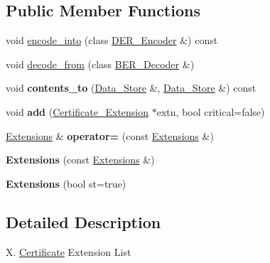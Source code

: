 \subsection*{Public Member Functions}
\begin{DoxyCompactItemize}
\item 
void \hyperlink{classBotan_1_1Extensions_a0481a2dbb859e6bceb2175a05ae1b677}{encode\-\_\-into} (class \hyperlink{classBotan_1_1DER__Encoder}{D\-E\-R\-\_\-\-Encoder} \&) const 
\item 
void \hyperlink{classBotan_1_1Extensions_adf10cf680ad029d66bec43437df44ab8}{decode\-\_\-from} (class \hyperlink{classBotan_1_1BER__Decoder}{B\-E\-R\-\_\-\-Decoder} \&)
\item 
\hypertarget{classBotan_1_1Extensions_a42724aad6ce755fe38a4aa60bc0d837a}{void {\bfseries contents\-\_\-to} (\hyperlink{classBotan_1_1Data__Store}{Data\-\_\-\-Store} \&, \hyperlink{classBotan_1_1Data__Store}{Data\-\_\-\-Store} \&) const }\label{classBotan_1_1Extensions_a42724aad6ce755fe38a4aa60bc0d837a}

\item 
\hypertarget{classBotan_1_1Extensions_aff13510727b5e8a77a2c375ee6551201}{void {\bfseries add} (\hyperlink{classBotan_1_1Certificate__Extension}{Certificate\-\_\-\-Extension} $\ast$extn, bool critical=false)}\label{classBotan_1_1Extensions_aff13510727b5e8a77a2c375ee6551201}

\item 
\hypertarget{classBotan_1_1Extensions_a16739cfe6fa191dad9acfe8c1e30ce5c}{\hyperlink{classBotan_1_1Extensions}{Extensions} \& {\bfseries operator=} (const \hyperlink{classBotan_1_1Extensions}{Extensions} \&)}\label{classBotan_1_1Extensions_a16739cfe6fa191dad9acfe8c1e30ce5c}

\item 
\hypertarget{classBotan_1_1Extensions_ae6e72ef343ba300763d2ff34807ae390}{{\bfseries Extensions} (const \hyperlink{classBotan_1_1Extensions}{Extensions} \&)}\label{classBotan_1_1Extensions_ae6e72ef343ba300763d2ff34807ae390}

\item 
\hypertarget{classBotan_1_1Extensions_a78b2df16b74373f1189eae9ed774bd80}{{\bfseries Extensions} (bool st=true)}\label{classBotan_1_1Extensions_a78b2df16b74373f1189eae9ed774bd80}

\end{DoxyCompactItemize}


\subsection{Detailed Description}
X. \hyperlink{classBotan_1_1Certificate}{Certificate} Extension List 

